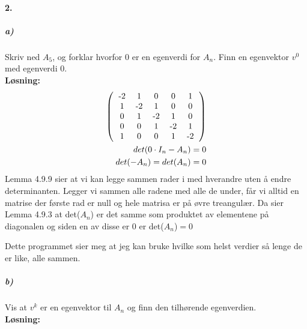 \documentclass[11pt, A4paper,norsk]{article}
\begin{document}
		\paragraph{2.}
			\subparagraph{a)}
				\begin{flushleft}
Skriv ned $A_5$, og forklar hvorfor $0$ er en egenverdi for $A_n$. Finn en egenvektor $v^0$ med egenverdi $0$. \\
\vspace{1mm}
\textbf{Løsning:} \\
\vspace{1mm}
					\begin{align}
\left( \begin{tabular}{ ccccc }
-2 & 1 & 0 & 0 & 1 \\
1 & -2 & 1 & 0 & 0 \\
0 & 1 & -2 & 1 & 0 \\
0 & 0 & 1 & -2 & 1 \\
1 & 0 & 0 & 1 & -2
\end{tabular} \right) \nonumber \\
det(0\cdot I_n - A_n) = 0 \nonumber \\
det(-A_n) = det(A_n) = 0 \nonumber
					\end{align}
Lemma 4.9.9 sier at vi kan legge sammen rader i med hverandre uten å endre determinanten. Legger vi sammen alle radene med alle de under, får vi alltid en matrise der første rad er null og hele matrisa er på øvre treangulær. Da sier Lemma 4.9.3 at det($A_n$) er det samme som produktet av elementene på diagonalen og siden en av disse er $0$ er det($A_n$)$ = 0$

Dette programmet sier meg at jeg kan bruke hvilke som helst verdier så lenge de er like, alle sammen.
				\end{flushleft}












			\subparagraph{b)}
				\begin{flushleft}
Vis at $v^k$ er en egenvektor til $A_n$ og finn den tilhørende egenverdien. \\
\vspace{1mm}
\clearpage
\textbf{Løsning:} \\
\vspace{1mm}
					\begin{align}
\nonumber
					\end{align}
				\end{flushleft}
\end{document}
